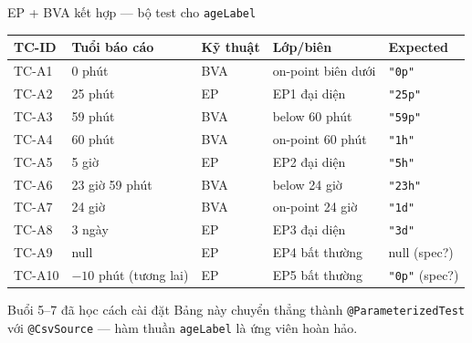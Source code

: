 \documentclass[aspectratio=169,12pt]{beamer}
\begin{document}
\begin{frame}[shrink=8]{EP + BVA kết hợp --- bộ test cho \texttt{ageLabel}}
  \begin{center}
  \small
  \setlength{\tabcolsep}{4pt}
  \begin{tabular}{lllll}
    \toprule
    \textbf{TC-ID} & \textbf{Tuổi báo cáo} & \textbf{Kỹ thuật} & \textbf{Lớp/biên} & \textbf{Expected} \\
    \midrule
    TC-A1 & 0 phút        & BVA & on-point biên dưới & \texttt{"0p"} \\
    TC-A2 & 25 phút       & EP  & EP1 đại diện       & \texttt{"25p"} \\
    TC-A3 & 59 phút       & BVA & below 60 phút      & \texttt{"59p"} \\
    TC-A4 & 60 phút       & BVA & on-point 60 phút   & \texttt{"1h"} \\
    TC-A5 & 5 giờ         & EP  & EP2 đại diện       & \texttt{"5h"} \\
    TC-A6 & 23 giờ 59 phút& BVA & below 24 giờ       & \texttt{"23h"} \\
    TC-A7 & 24 giờ        & BVA & on-point 24 giờ    & \texttt{"1d"} \\
    TC-A8 & 3 ngày        & EP  & EP3 đại diện       & \texttt{"3d"} \\
    TC-A9 & null          & EP  & EP4 bất thường     & null (spec?) \\
    TC-A10 & $-10$ phút (tương lai) & EP & EP5 bất thường & \texttt{"0p"} (spec?) \\
    \bottomrule
  \end{tabular}
  \end{center}

  \vspace{0.2em}
  \begin{exampleblock}{Buổi 5--7 đã học cách cài đặt}
    Bảng này chuyển thẳng thành \texttt{@ParameterizedTest} với
    \texttt{@CsvSource} --- hàm thuần \texttt{ageLabel} là ứng viên hoàn hảo.
  \end{exampleblock}
\end{frame}
\end{document}

